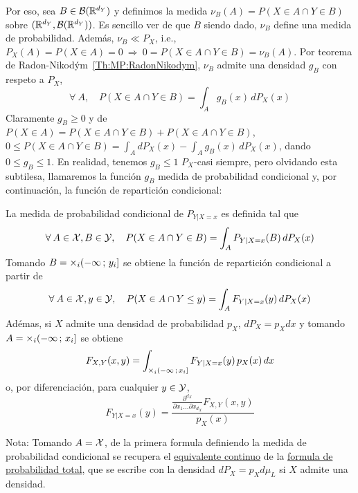 {Por eso, sea $B \in \mathcal{B}(\mathbb{R}^{d_Y})$ y definimos la medida $\nu_B(A) = P(X \in A
\cap Y  \in B)$ sobre  $(\mathbb{R}^{d_Y},\mathcal{B}(\mathbb{R}^{d_Y}))$.  Es sencillo ver  de que
$B$ siendo dado, $\nu_B$ define una medida de probabilidad. Adem\'as, $\nu_B \ll
P_X$, i.e., $P_X(A) = P(X \in A) = 0  \: \Rightarrow \: 0 = P(X \in A \cap Y \in
B)  =  \nu_B(A)$.    Por  teorema  de  Radon-Nikod\'ym~\ref{Th:MP:RadonNikodym},
$\nu_B$ admite una densidad $g_B$ con respeto a $P_X$,
%
\[
\forall \: A, \quad P(X \in A \cap Y \in B) = \int_A g_B(x) \, dP_X(x)
\]
%
Claramente $g_B \ge 0$  y de $P(X \in A) =  P(X \in A \cap Y \in B)  + P(X \in A
\cap Y  \in B)$,  \ie $\displaystyle  0 \le  P(X \in A  \cap Y  \in B)  = \int_A
dP_X(x) -  \int_A g_B(x)  \, dP_X(x)$, dando  $0 \le  g_B \le 1$.   En realidad,
tenemos  $g_B  \le  1$   $P_X$-casi  siempre,  pero  olvidando  esta  subtilesa,
llamaremos  la  funci\'on  $g_B$  medida  de  probabilidad  condicional  y,  por
continuaci\'on, la funci\'on de repartici\'on condicional:
%
\begin{definicion}\label{Def:MP:FRCondicional}
  La medida de probabilidad condicional de $P_{Y|X=x}$ es definida tal que
  \[
  \forall  \: A  \in \mathcal{X},  B \in  \mathcal{Y}, \quad  P(X \in  A \cap  Y \in  B)  = \int_A
  P_{Y|X=x}(B) \, dP_X(x)
  \]
  Tomando $B  = \operatorname*{\times}_i  (-\infty \, ;  \, y_i]$  se obtiene la  funci\'on de
  repartici\'on condicional a partir de
  \[
  \forall  \: A  \in \mathcal{X},  y \in  \mathcal{Y}, \quad  P(X \in  A \cap  Y \le  y)  = \int_A
  F_{Y|X=x}(y) \, dP_X(x)
  \]
  Ad\'emas, si $X$ admite una densidad  de probabilidad $p_X$, $dP_X = p_X dx$ y
  tomando $A = \operatorname*{\times}_i (-\infty \, ; \, x_i]$ se obtiene
  \[
  F_{X,Y}(x,y) = \int_{\operatorname*{\times}_i (-\infty \,  ; \, x_i]} F_{Y|X=x}(y) \, p_X(x)
  \, dx
  \]
  o, por diferenciaci\'on, para cualquier $y \in \mathcal{Y}$,
  \[
  F_{Y|X=x}(y)   =  \frac{\frac{\partial^{d_X}}{\partial  x_1   \ldots  \partial
      x_{d_X}} F_{X,Y}(x,y)}{p_X(x)}
  \]
\end{definicion}
%
\noindent Nota: Tomando $A = \mathcal{X}$,  de la primera formula definiendo la medida de
probabilidad condicional  se recupera el \underline{equivalente  continuo} de la
\underline{formula de probabilidad total}, que  se escribe con la densidad $dP_X
= p_X d\mu_L$ si $X$ admite una densidad.

}
